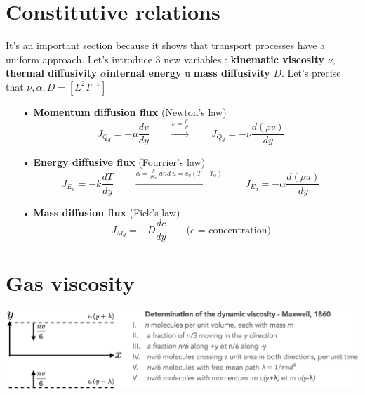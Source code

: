 \section{Constitutive relations}
	It's an important section because it shows that transport processes have a uniform approach. Let's introduce 3 new variables : \textbf{kinematic viscosity} $\nu$, \textbf{thermal diffusivity }$\alpha$\textbf{internal energy} u \textbf{mass diffusivity} $D$. Let's precise that $\nu , \alpha , D = [L^2T^{-1}]$\\
	\begin{itemize}
		\item[•] \textbf{Momentum diffusion flux} (Newton's law)
		\begin{equation}
			J_{Q_d}=-\mu \frac{dv}{dy} \qquad \xrightarrow {\nu = \frac{\mu}{\rho}} \qquad J_{Q_d}=-\nu \frac{d(\rho v)}{dy}
			\label{equation:1.11}
		\end{equation}
		
		\item[•] \textbf{Energy diffusive flux} (Fourrier's law)
		\begin{equation}
			J_{E_d} = -k\frac{dT}{dy} \qquad \xrightarrow{\alpha = \frac{k}{\rho c_v} \ and \ u = c_v(T-T_0)} \qquad J_{E_d} = -\alpha\frac{d(\rho u)}{dy}
		\end{equation}
		
		\item[•] \textbf{Mass diffusion flux} (Fick's law)
		\begin{equation}
			J_{M_d} = -D \frac{dc}{dy} \qquad \mbox{($c$ = concentration)}
		\end{equation}
	\end{itemize}
	
\section{Gas viscosity}
	\begin{center}
	\includegraphics[scale=0.45]{ch1/8}
	\end{center}
	
